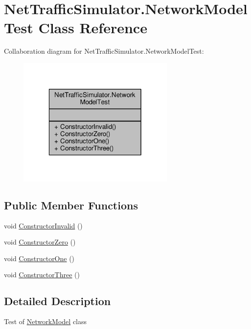 \hypertarget{classNetTrafficSimulator_1_1NetworkModelTest}{\section{Net\-Traffic\-Simulator.\-Network\-Model\-Test Class Reference}
\label{classNetTrafficSimulator_1_1NetworkModelTest}
}


Collaboration diagram for Net\-Traffic\-Simulator.\-Network\-Model\-Test\-:\nopagebreak
\begin{figure}[H]
\begin{center}
\leavevmode
\includegraphics[width=220pt]{classNetTrafficSimulator_1_1NetworkModelTest__coll__graph}
\end{center}
\end{figure}
\subsection*{Public Member Functions}
\begin{DoxyCompactItemize}
\item 
void \hyperlink{classNetTrafficSimulator_1_1NetworkModelTest_afbd7470eb35b97512aa94a2f53163430}{Constructor\-Invalid} ()
\item 
void \hyperlink{classNetTrafficSimulator_1_1NetworkModelTest_a3634f2a5d0e008e7cd8b274615b173ee}{Constructor\-Zero} ()
\item 
void \hyperlink{classNetTrafficSimulator_1_1NetworkModelTest_a6a13d32fefa5e53b7f18e89b2fb8b436}{Constructor\-One} ()
\item 
void \hyperlink{classNetTrafficSimulator_1_1NetworkModelTest_a149aa9eab4b53fb17aa19be215e769b5}{Constructor\-Three} ()
\end{DoxyCompactItemize}


\subsection{Detailed Description}
Test of \hyperlink{classNetTrafficSimulator_1_1NetworkModel}{Network\-Model} class 

